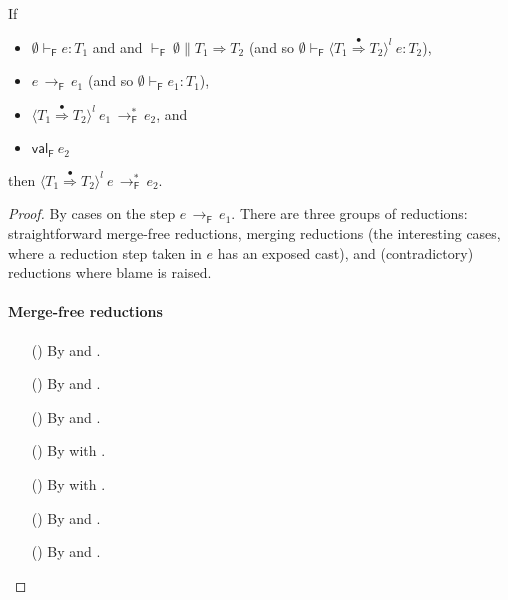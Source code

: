 \documentclass[9pt]{extarticle}
\newcommand{\ottnt}[1]{\mathit{#1}}
\begin{document}
{\begin{lemma}
  \label{lem:forgetfulcastcongruencesinglestep}
  If
  \begin{itemize}
  \item $ \emptyset   \vdash _{  \mathsf{F}  }  \ottnt{e}  :  \ottnt{T_{{\mathrm{1}}}} $ and and $ \mathord{  \vdash _{  \mathsf{F}  } }~ \emptyset   \mathrel{\parallel}   \ottnt{T_{{\mathrm{1}}}}  \Rightarrow  \ottnt{T_{{\mathrm{2}}}} $
    (and so $ \emptyset   \vdash _{  \mathsf{F}  }   \langle  \ottnt{T_{{\mathrm{1}}}}  \mathord{ \overset{\bullet}{\Rightarrow} }  \ottnt{T_{{\mathrm{2}}}}  \rangle^{ \ottnt{l} } ~  \ottnt{e}   :  \ottnt{T_{{\mathrm{2}}}} $),
  \item $\ottnt{e} \,  \longrightarrow _{  \mathsf{F}  }  \, \ottnt{e_{{\mathrm{1}}}}$ (and so $ \emptyset   \vdash _{  \mathsf{F}  }  \ottnt{e_{{\mathrm{1}}}}  :  \ottnt{T_{{\mathrm{1}}}} $),
  \item $ \langle  \ottnt{T_{{\mathrm{1}}}}  \mathord{ \overset{\bullet}{\Rightarrow} }  \ottnt{T_{{\mathrm{2}}}}  \rangle^{ \ottnt{l} } ~  \ottnt{e_{{\mathrm{1}}}}  \,  \longrightarrow ^{*}_{  \mathsf{F}  }  \, \ottnt{e_{{\mathrm{2}}}}$, and
  \item $ \mathsf{val} _{  \mathsf{F}  }~ \ottnt{e_{{\mathrm{2}}}} $
  \end{itemize}
then $ \langle  \ottnt{T_{{\mathrm{1}}}}  \mathord{ \overset{\bullet}{\Rightarrow} }  \ottnt{T_{{\mathrm{2}}}}  \rangle^{ \ottnt{l} } ~  \ottnt{e}  \,  \longrightarrow ^{*}_{  \mathsf{F}  }  \, \ottnt{e_{{\mathrm{2}}}}$.
\begin{proof}
    By cases on the step $\ottnt{e} \,  \longrightarrow _{  \mathsf{F}  }  \, \ottnt{e_{{\mathrm{1}}}}$. There are three groups of
    reductions: straightforward merge-free reductions, merging
    reductions (the interesting cases, where a reduction step taken in
    $\ottnt{e}$ has an exposed cast), and (contradictory) reductions where
    blame is raised.
{\iffull
    \paragraph{Merge-free reductions}
    \begin{itemize}
    \item[(\E{Beta})] By  and .
    \item[(\E{Op})] By  and .
    \item[(\E{Unwrap})] By  and .
    \item[(\E{AppL})] By  with .
    \item[(\E{AppR})] By  with .
    \item[(\E{CheckOK})] By  and .
    \item[(\E{OpInner})] By  and .
    \end{itemize}

}
\end{proof}
\end{lemma}}
\end{document}
